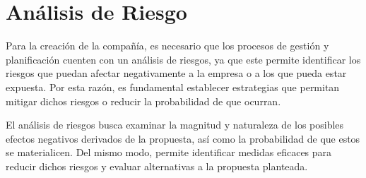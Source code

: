 \section*{Análisis de Riesgo}

Para la creación de la compañía, es necesario que los procesos de gestión y planificación cuenten con un análisis de riesgos, ya que este permite identificar los riesgos que puedan afectar negativamente a la empresa o a los que pueda estar expuesta. Por esta razón, es fundamental establecer estrategias que permitan mitigar dichos riesgos o reducir la probabilidad de que ocurran.

El análisis de riesgos busca examinar la magnitud y naturaleza de los posibles efectos negativos derivados de la propuesta, así como la probabilidad de que estos se materialicen. Del mismo modo, permite identificar medidas eficaces para reducir dichos riesgos y evaluar alternativas a la propuesta planteada.








